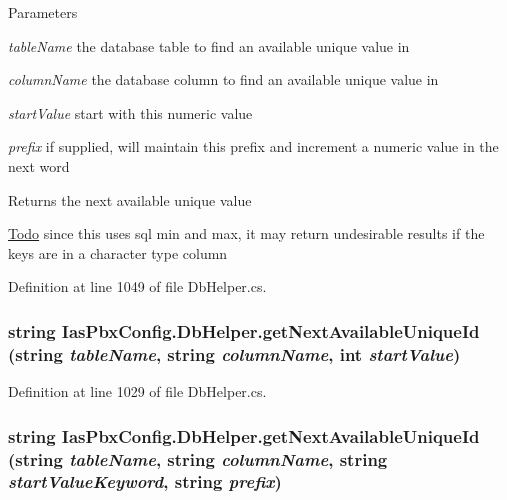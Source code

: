 \begin{DoxyParams}{Parameters}
\item[{\em tableName}]the database table to find an available unique value in \item[{\em columnName}]the database column to find an available unique value in \item[{\em startValue}]start with this numeric value \item[{\em prefix}]if supplied, will maintain this prefix and increment a numeric value in the next word \end{DoxyParams}
\begin{DoxyReturn}{Returns}
the next available unique value 
\end{DoxyReturn}
\begin{Desc}
\item[\hyperlink{todo__todo000025}{Todo}]since this uses sql min and max, it may return undesirable results if the keys are in a character type column \end{Desc}


Definition at line 1049 of file DbHelper.cs.\hypertarget{class_ias_pbx_config_1_1_db_helper_a2bd877f0a61b7989f6da77d7f637ecb8}{
\subsubsection[{getNextAvailableUniqueId}]{\setlength{\rightskip}{0pt plus 5cm}string IasPbxConfig.DbHelper.getNextAvailableUniqueId (string {\em tableName}, \/  string {\em columnName}, \/  int {\em startValue})}}
\label{class_ias_pbx_config_1_1_db_helper_a2bd877f0a61b7989f6da77d7f637ecb8}


Definition at line 1029 of file DbHelper.cs.\hypertarget{class_ias_pbx_config_1_1_db_helper_af6021c5b8518091fd73155119935ebd8}{
\subsubsection[{getNextAvailableUniqueId}]{\setlength{\rightskip}{0pt plus 5cm}string IasPbxConfig.DbHelper.getNextAvailableUniqueId (string {\em tableName}, \/  string {\em columnName}, \/  string {\em startValueKeyword}, \/  string {\em prefix})}}
\label{class_ias_pbx_config_1_1_db_helper_af6021c5b8518091fd73155119935ebd8}



